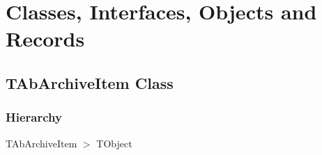 \documentclass{report}
\newif\ifpdf
\begin{document}
\section{Classes, Interfaces, Objects and Records}
\ifpdf
\subsection*{\large{\textbf{TAbArchiveItem Class}}\normalsize\hspace{1ex}\hrulefill}
\else
\subsection*{TAbArchiveItem Class}
\fi
\label{AbArcTyp.TAbArchiveItem}
\subsubsection*{\large{\textbf{Hierarchy}}\normalsize\hspace{1ex}\hfill}
TAbArchiveItem {$>$} TObject
\end{document}
